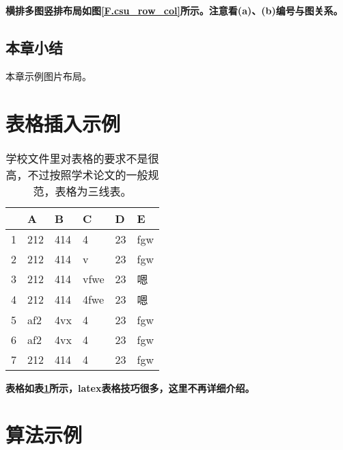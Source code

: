 \textbf{横排多图竖排布局如图\ref{F.csu_row_col}所示。注意看(a)、(b)编号与图关系。}

\subsection{本章小结}
本章示例图片布局。

\newpage


\section{表格插入示例}

\begin{table}[htb]
  \centering
  \caption{学校文件里对表格的要求不是很高，不过按照学术论文的一般规范，表格为三线表。}
  \label{T.example}
  \begin{tabular}{llllll}
  	\toprule
   & A  & B  & C  & D  & E \\
  \toprule
1 	& 212 & 414 & 4 		& 23 & fgw	\\
2 	& 212 & 414 & v 		& 23 & fgw	\\
3 	& 212 & 414 & vfwe		& 23 & 嗯	\\
4 	& 212 & 414 & 4fwe		& 23 & 嗯	\\
5 	& af2 & 4vx & 4 		& 23 & fgw	\\
6 	& af2 & 4vx & 4 		& 23 & fgw	\\
7 	& 212 & 414 & 4 		& 23 & fgw	\\
\bottomrule

\end{tabular}
\end{table}




\textbf{表格如表\ref{T.example}所示，latex表格技巧很多，这里不再详细介绍。}


\newpage

\section{算法示例}


